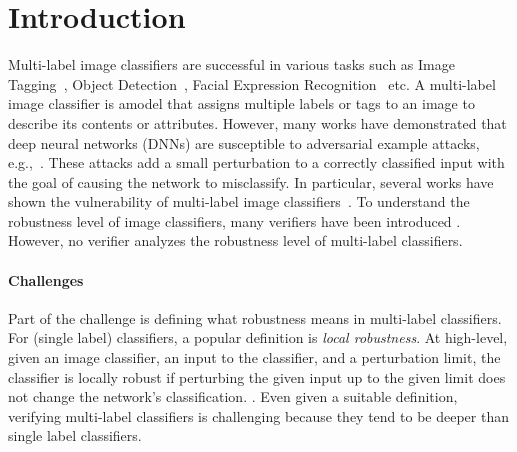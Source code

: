 
\section{Introduction}

Multi-label image classifiers are successful in various tasks such as Image Tagging~\cite{IMAGETAGGING}, Object Detection~\cite{ObjectDetection}, Facial Expression Recognition~\cite{FacialRec} etc.
A multi-label image classifier is amodel that assigns multiple labels or tags to an image to describe its contents or attributes.
However, many works have demonstrated that deep neural networks (DNNs) are susceptible to adversarial example attacks, e.g.,~\cite{ref7,ref15,szegedy2014intriguing,ref17,ref29,ref56}.
These attacks add a small perturbation to a correctly classified input with the goal of causing the network to misclassify.
In particular, several works have shown the vulnerability of multi-label image classifiers~\cite{MultiVul1, MultiVul2, MultiVul3}.
To understand the robustness level of image classifiers, many verifiers have been introduced .
However, no verifier analyzes the robustness level of multi-label classifiers. %

\paragraph{Challenges} Part of the challenge is defining what robustness means in multi-label classifiers.
For (single label) classifiers, a popular definition is \emph{local robustness}.
At high-level, given an image classifier, an input to the classifier, and a perturbation limit, the classifier is locally robust if perturbing the given input up to the given limit does not change the network's classification. .
Even given a suitable definition, verifying multi-label classifiers is challenging because they tend to be deeper than single label classifiers. 

